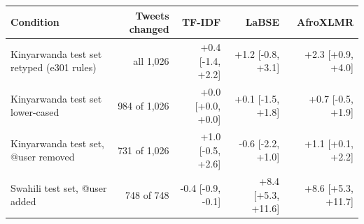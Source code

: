 \begin{tabular}{lrrrr}
\toprule
Condition & Tweets changed & TF-IDF & LaBSE & AfroXLMR \\
\midrule
Kinyarwanda test set retyped (e301 rules) & all 1,026 & +0.4 [-1.4, +2.2] & +1.2 [-0.8, +3.1] & +2.3 [+0.9, +4.0] \\
Kinyarwanda test set lower-cased & 984 of 1,026 & +0.0 [+0.0, +0.0] & +0.1 [-1.5, +1.8] & +0.7 [-0.5, +1.9] \\
Kinyarwanda test set, @user removed & 731 of 1,026 & +1.0 [-0.5, +2.6] & -0.6 [-2.2, +1.0] & +1.1 [+0.1, +2.2] \\
Swahili test set, @user added & 748 of 748 & -0.4 [-0.9, -0.1] & +8.4 [+5.3, +11.6] & +8.6 [+5.3, +11.7] \\
\bottomrule
\end{tabular}
